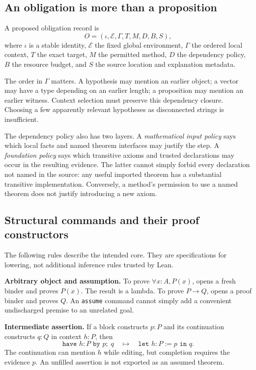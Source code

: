 \documentclass[11pt,a4paper]{article}
\newcommand{\EE}{\mathcal E}
\newcommand{\codeid}[1]{\nolinkurl{#1}}
\begin{document}
\subsection{An obligation is more than a proposition}

A proposed obligation record is
\[
 O=(\iota,\EE,\Gamma,T,M,D,B,S),
\]
where $\iota$ is a stable identity, $\EE$ the fixed global environment, $\Gamma$ the ordered local context, $T$ the exact target, $M$ the permitted method, $D$ the dependency policy, $B$ the resource budget, and $S$ the source location and explanation metadata.

The order in $\Gamma$ matters. A hypothesis may mention an earlier object; a vector may have a type depending on an earlier length; a proposition may mention an earlier witness. Context selection must preserve this dependency closure. Choosing a few apparently relevant hypotheses as disconnected strings is insufficient.

The dependency policy also has two layers. A \emph{mathematical input policy} says which local facts and named theorem interfaces may justify the step. A \emph{foundation policy} says which transitive axioms and trusted declarations may occur in the resulting evidence. The latter cannot simply forbid every declaration not named in the source: any useful imported theorem has a substantial transitive implementation. Conversely, a method's permission to use a named theorem does not justify introducing a new axiom.

\subsection{Structural commands and their proof constructors}

The following rules describe the intended core. They are specifications for lowering, not additional inference rules trusted by Lean.

\textbf{Arbitrary object and assumption.} To prove $\forall x:A, P(x)$, \texttt{} opens a fresh binder and proves $P(x)$. The result is a lambda. To prove $P\to Q$, \texttt{} opens a proof binder and proves $Q$. An \codeid{assume} command cannot simply add a convenient undischarged premise to an unrelated goal.

\textbf{Intermediate assertion.} If a block constructs $p:P$ and its continuation constructs $q:Q$ in context $h:P$, then
\[
 \texttt{have }h:P\texttt{ by }p;\;q
 \quad\longmapsto\quad
 \texttt{let }h:P:=p\texttt{ in }q.
\]
The continuation can mention $h$ while editing, but completion requires the evidence $p$. An unfilled assertion is not exported as an assumed theorem.
\end{document}
